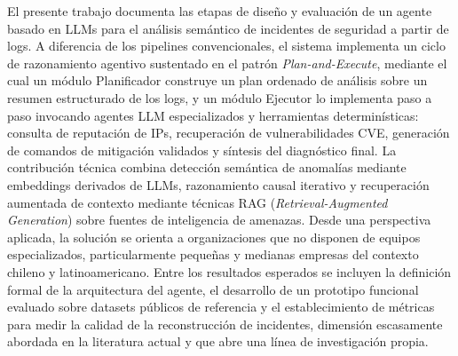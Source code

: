 El presente trabajo documenta las etapas de diseño y evaluación de un agente basado en LLMs para el análisis semántico de incidentes de seguridad a partir de logs. A diferencia de los pipelines convencionales, el sistema implementa un ciclo de razonamiento agentivo sustentado en el patrón \textit{Plan-and-Execute}, mediante el cual un módulo Planificador construye un plan ordenado de análisis sobre un resumen estructurado de los logs, y un módulo Ejecutor lo implementa paso a paso invocando agentes LLM especializados y herramientas determinísticas: consulta de reputación de IPs, recuperación de vulnerabilidades CVE, generación de comandos de mitigación validados y síntesis del diagnóstico final. La contribución técnica combina detección semántica de anomalías mediante embeddings derivados de LLMs, razonamiento causal iterativo y recuperación aumentada de contexto mediante técnicas RAG (\textit{Retrieval-Augmented Generation}) sobre fuentes de inteligencia de amenazas. Desde una perspectiva aplicada, la solución se orienta a organizaciones que no disponen de equipos especializados, particularmente pequeñas y medianas empresas del contexto chileno y latinoamericano. Entre los resultados esperados se incluyen la definición formal de la arquitectura del agente, el desarrollo de un prototipo funcional evaluado sobre datasets públicos de referencia y el establecimiento de métricas para medir la calidad de la reconstrucción de incidentes, dimensión escasamente abordada en la literatura actual y que abre una línea de investigación propia.